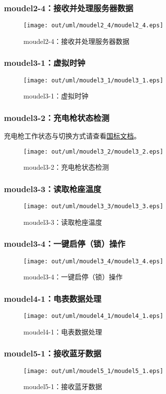 \subsubsection{moudel2-4：接收并处理服务器数据}
\begin{figure}[H]
  \centering
  \texttt{[image: out/uml/moudel2\_4/moudel2\_4.eps]}
  \caption{moudel2-4：接收并处理服务器数据}
\end{figure}

\subsubsection{moudel3-1：虚拟时钟}
\begin{figure}[H]
  \centering
  \texttt{[image: out/uml/moudel3\_1/moudel3\_1.eps]}
  \caption{moudel3-1：虚拟时钟}
\end{figure}

\subsubsection{moudel3-2：充电枪状态检测}
充电枪工作状态与切换方式请查看\href{http://www.95598.cn/download/18487.1-2015.pdf}{国标文档}。

\begin{figure}[H]
  \centering
  \texttt{[image: out/uml/moudel3\_2/moudel3\_2.eps]}
  \caption{moudel3-2：充电枪状态检测}
\end{figure}

\subsubsection{moudel3-3：读取枪座温度}
\begin{figure}[H]
  \centering
  \texttt{[image: out/uml/moudel3\_3/moudel3\_3.eps]}
  \caption{moudel3-3：读取枪座温度}
\end{figure}

\subsubsection{moudel3-4：一键启停（锁）操作}
\begin{figure}[H]
  \centering
  \texttt{[image: out/uml/moudel3\_4/moudel3\_4.eps]}
  \caption{moudel3-4：一键启停（锁）操作}
\end{figure}

\subsubsection{moudel4-1：电表数据处理}
\begin{figure}[H]
  \centering
  \texttt{[image: out/uml/moudel4\_1/moudel4\_1.eps]}
  \caption{moudel4-1：电表数据处理}
\end{figure}

\subsubsection{moudel5-1：接收蓝牙数据}
\begin{figure}[H]
  \centering
  \texttt{[image: out/uml/moudel5\_1/moudel5\_1.eps]}
  \caption{moudel5-1：接收蓝牙数据}
\end{figure}
